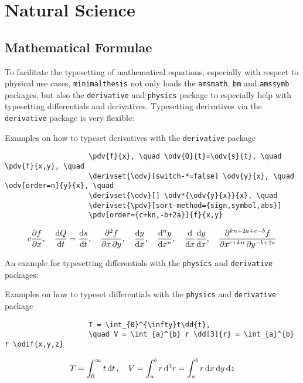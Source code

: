 			
			\newpage
			\label{page:example:header-with-chapter}
			\blindtext[4]
			
	\chapter{Natural Science}
		\section{Mathematical Formulae}
			To facilitate the typesetting of mathematical equations, especially with respect to physical use cases, \verb|minimalthesis| not only loads the \verb|amsmath|, \verb|bm| and \verb|amssymb| packages, but also the \verb|derivative| and \verb|physics| package to especially help with typesetting differentials and derivatives.
			\newline Typesetting derivatives via the \verb|derivative| package is very flexible: 
			\begin{table}[h!]
				\centering
				\caption{Examples on how to typeset derivatives with the \texttt{derivative} package}
				\begin{verbatim}
					\pdv{f}{x}, \quad \odv{Q}{t}=\odv{s}{t}, \quad \pdv{f}{x,y}, \quad 
					\derivset{\odv}[switch-*=false] \odv{y}{x}, \quad \odv[order=n]{y}{x}, \quad
					\derivset{\odv}[] \odv*{\odv{y}{x}}{x}, \quad 
					\derivset{\pdv}[sort-method={sign,symbol,abs}] 
					\pdv[order={c+kn,-b+2a}]{f}{x,y}
				\end{verbatim}
				\begin{align*}{c}
					\pdv{f}{x}, \quad \odv{Q}{t}=\odv{s}{t}, \quad \pdv{f}{x,y}, \quad 
					\derivset{\odv}[switch-*=false] \odv{y}{x}, \quad \odv[order=n]{y}{x}, \quad
					\derivset{\odv}[] \odv*{\odv{y}{x}}{x}, \quad 
					\derivset{\pdv}[sort-method={sign,symbol,abs}] \pdv[order={c+kn,-b+2a}]{f}{x,y}
				\end{align*}
			\end{table}
			An example for typesetting differentials with the \verb|physics| and \verb|derivative| packages:
			\begin{table}[h!]
				\centering
				\caption{Examples on how to typeset differentials with the \texttt{physics} and \texttt{derivative} package}
				\begin{verbatim}
					T = \int_{0}^{\infty}t\dd{t}, 
					\quad V = \int_{a}^{b} r \dd[3]{r} = \int_{a}^{b} r \odif{x,y,z}
				\end{verbatim}
				\begin{align*}
					T = \int_{0}^{\infty}t\dd{t}, \quad V = \int_{a}^{b} r \dd[3]{r} = \int_{a}^{b} r \odif{x,y,z}
				\end{align*}
				
			\end{table}
		
